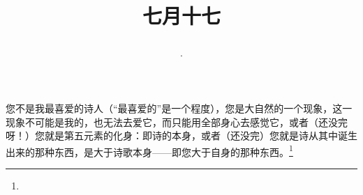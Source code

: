 \title{\date[d=20,m=8,y=2024][year:cn-y,年,month:cn,day:cn,日,·,weekday]·七月十七 }
您不是我最喜爱的诗人（“最喜爱的”是一个程度），您是大自然的一个现象，这一现象不可能是我的，也无法去爱它，而只能用全部身心去感觉它，或者（还没完呀！）您就是第五元素的化身：即诗的本身，或者（还没完）您就是诗从其中诞生出来的那种东西，是大于诗歌本身——即您大于自身的那种东西。\footnote{ }

